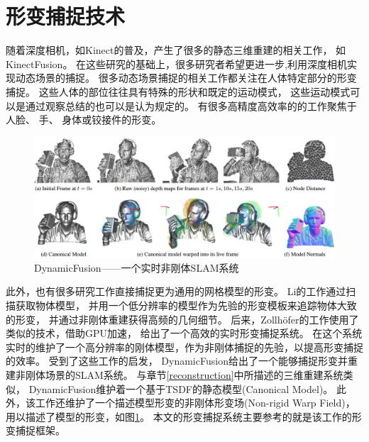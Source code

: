 \section{形变捕捉技术}
随着深度相机，如Kinect\cite{microsoft_kinect}的普及，产生了很多的静态三维重建的相关工作，
如KinectFusion\cite{newcombe2011kinectfusion}。
在这些研究的基础上，很多研究者希望更进一步,利用深度相机实现动态场景的捕捉。
很多动态场景捕捉的相关工作都关注在人体特定部分的形变捕捉。
这些人体的部位往往具有特殊的形状和既定的运动模式，
这些运动模式可以是通过观察总结的也可以是认为规定的。
有很多高精度高效率的的工作聚焦于人脸\cite{cao20133d}\cite{li2013realtime}、
手\cite{oikonomidis2011efficient}\cite{qian2014realtime}、
身体\cite{taylor2012vitruvian}或铰接件\cite{schmidt2014dart}\cite{ye2014real}的形变。
\begin{figure}[h]
    \centering
    \includegraphics[width = \textwidth]{./Pictures/dynamic_fusion.eps}
    \caption{DynamicFusion——一个实时非刚体SLAM系统}
    \label{dynamic_fusion}
\end{figure}

此外，也有很多研究工作直接捕捉更为通用的网格模型的形变。
Li的工作\cite{li2009robust}通过扫描获取物体模型，
并用一个低分辨率的模型作为先验的形变模板来追踪物体大致的形变，
并通过非刚体重建获得高频的几何细节。
后来，Zollh{\"o}fer\cite{zollhofer2014real}的工作使用了类似的技术，借助GPU加速，
给出了一个高效的实时形变捕捉系统。
在这个系统实时的维护了一个高分辨率的刚体模型，作为非刚体捕捉的先验，以提高形变捕捉的效率。
受到了这些工作的启发，
DynamicFusion\cite{newcombe2015dynamicfusion}给出了一个能够捕捉形变并重建非刚体场景的SLAM系统。
与章节\ref{reconstruction}中所描述的三维重建系统类似，
DynamicFusion维护着一个基于TSDF的静态模型(Canonical Model)。
此外，该工作还维护了一个描述模型形变的非刚体形变场(Non-rigid Warp Field)，
用以描述了模型的形变，如图\ref{dynamic_fusion}。
本文的形变捕捉系统主要参考的就是该工作的形变捕捉框架。



